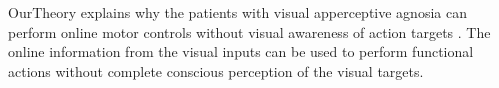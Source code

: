 \documentclass[utf8]{article}
\begin{document}
                
        		
                \ac{OurTheory} explains why the patients with visual apperceptive agnosia \citep{james2003ventral} can perform online motor controls without visual awareness of action targets \citep{10.3389/fneur.2014.00255}. The online information from the visual inputs can be used to perform  functional actions without complete conscious perception of the visual targets. 
                
                
        		
\end{document}
